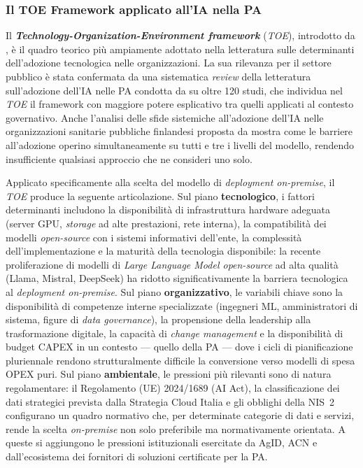 \subsubsection*{Il TOE Framework applicato all'IA nella PA}

Il \textbf{\textit{Technology-Organization-Environment framework}} (\textit{TOE}), introdotto da \textcite{TornatzkyFleischer1990}, è il quadro teorico più ampiamente adottato nella letteratura sulle determinanti dell'adozione tecnologica nelle organizzazioni. La sua rilevanza per il settore pubblico è stata confermata da una sistematica \textit{review} della letteratura sull'adozione dell'IA nelle PA condotta da \textcite{MadanAshok2022} su oltre 120 studi, che individua nel \textit{TOE} il framework con maggiore potere esplicativo tra quelli applicati al contesto governativo. Anche l'analisi delle sfide sistemiche all'adozione dell'IA nelle organizzazioni sanitarie pubbliche finlandesi proposta da \textcite{PulkkinenTOE2025} mostra come le barriere all'adozione operino simultaneamente su tutti e tre i livelli del modello, rendendo insufficiente qualsiasi approccio che ne consideri uno solo.

Applicato specificamente alla scelta del modello di \textit{deployment on-premise}, il \textit{TOE} produce la seguente articolazione. Sul piano \textbf{tecnologico}, i fattori determinanti includono la disponibilità di infrastruttura hardware adeguata (server GPU, \textit{storage} ad alte prestazioni, rete interna), la compatibilità dei modelli \textit{open-source} con i sistemi informativi dell'ente, la complessità dell'implementazione e la maturità della tecnologia disponibile: la recente proliferazione di modelli di \textit{Large Language Model open-source} ad alta qualità (Llama, Mistral, DeepSeek) ha ridotto significativamente la barriera tecnologica al \textit{deployment on-premise}. Sul piano \textbf{organizzativo}, le variabili chiave sono la disponibilità di competenze interne specializzate (ingegneri ML, amministratori di sistema, figure di \textit{data governance}), la propensione della leadership alla trasformazione digitale, la capacità di \textit{change management} e la disponibilità di budget CAPEX in un contesto — quello della PA — dove i cicli di pianificazione pluriennale rendono strutturalmente difficile la conversione verso modelli di spesa OPEX puri. Sul piano \textbf{ambientale}, le pressioni più rilevanti sono di natura regolamentare: il Regolamento (UE) 2024/1689 (AI Act), la classificazione dei dati strategici prevista dalla Strategia Cloud Italia e gli obblighi della NIS~2 configurano un quadro normativo che, per determinate categorie di dati e servizi, rende la scelta \textit{on-premise} non solo preferibile ma normativamente orientata. A queste si aggiungono le pressioni istituzionali esercitate da AgID, ACN e dall'ecosistema dei fornitori di soluzioni certificate per la PA.

